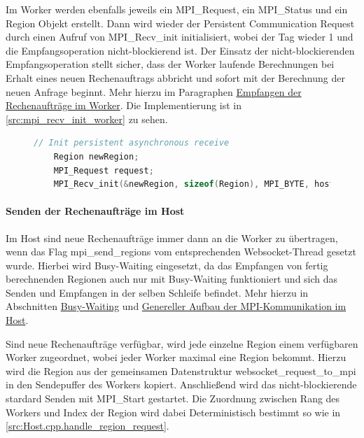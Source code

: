 Im Worker werden ebenfalls jeweils ein MPI\_Request, ein MPI\_Status und ein Region Objekt erstellt. Dann wird wieder der Persistent Communication Request durch einen Aufruf von MPI\_Recv\_init initialisiert, wobei der Tag wieder 1 und die Empfangsoperation nicht-blockierend ist. Der Einsatz der nicht-blockierenden Empfangsoperation stellt sicher, dass der Worker laufende Berechnungen bei Erhalt eines neuen Rechenauftrags abbricht und sofort mit der Berechnung der neuen Anfrage beginnt. Mehr hierzu im Paragraphen \hyperref[para:recv_worker]{Empfangen der Rechenaufträge im Worker}.
Die Implementierung ist in \autoref{src:mpi_recv_init_worker} zu sehen.

\begin{figure}[h!]
	
\end{figure}

\begin{figure}[h!]
	\begin{lstlisting}[language=c++, caption={Initialisierung des Persistent Communication Requests im Worker}, label={src:mpi_recv_init_worker}, firstnumber=56]
	// Init persistent asynchronous receive
	Region newRegion;
	MPI_Request request;
	MPI_Recv_init(&newRegion, sizeof(Region), MPI_BYTE, host_rank, 1, MPI_COMM_WORLD, &request);
	\end{lstlisting}
\end{figure}

\paragraph{Senden der Rechenaufträge im Host}\label{para:send_host}

Im Host sind neue Rechenaufträge immer dann an die Worker zu übertragen, wenn das Flag mpi\_send\_regions vom entsprechenden Websocket-Thread gesetzt wurde. Hierbei wird Busy-Waiting eingesetzt, da das Empfangen von fertig berechnenden Regionen auch nur mit Busy-Waiting funktioniert und sich das Senden und Empfangen in der selben Schleife befindet. Mehr hierzu in Abschnitten \hyperref[para:mpi_busy_waiting]{Busy-Waiting} und \hyperref[para:mpi_generell_host]{Genereller Aufbau der MPI-Kommunikation im Host}.

Sind neue Rechenaufträge verfügbar, wird jede einzelne Region einem verfügbaren Worker zugeordnet, wobei jeder Worker maximal eine Region bekommt.
Hierzu wird die Region aus der gemeinsamen Datenstruktur websocket\_request\_to\_mpi in den Sendepuffer des Workers kopiert. Anschließend wird das nicht-blockierende stardard Senden mit MPI\_Start gestartet.
Die Zuordnung zwischen Rang des Workers und Index der Region wird dabei Deterministisch bestimmt so wie in \autoref{src:Host.cpp.handle_region_request}.

